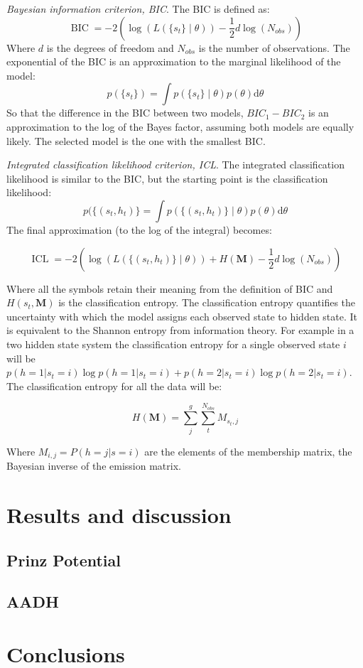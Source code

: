 \emph{Bayesian information criterion, BIC}. The BIC is defined as: 
\begin{equation}
    \operatorname{BIC} = -2\left(\log{\left(L\left(\{s_t\}\middle|\theta\right)\right)} - \frac{1}{2}d\log{\left(N_{obs}\right)}\right)
\end{equation}
Where $d$ is the degrees of freedom and $N_{obs}$ is the number of observations.  
The exponential of the BIC is an approximation to the marginal likelihood of the model:
\begin{equation}
    p(\{s_t\}) = \int p\left(\{s_{t}\}\middle |\theta \right)p(\theta) \mathrm{d}\theta
\end{equation}
So that the difference in the BIC between two models, $BIC_{1}-BIC_{2}$ is an approximation to the log of the Bayes factor, assuming both models are equally likely. The selected model is the one with the smallest BIC. 

\emph{Integrated classification likelihood criterion, ICL}. 
The integrated classification likelihood is similar to the BIC, but the starting point is the classification likelihood: 
\begin{equation}
    p(\{(s_t, h_t)\} = \int p\left(\{(s_{t}, h_{t})\}\middle |\theta \right)p(\theta) \mathrm{d}\theta
\end{equation}
The final approximation (to the log of the integral) becomes: 

\begin{equation}
        \operatorname{ICL} = -2\left(\log{\left(L\left(\{(s_t, h_{t})\}\middle|\theta\right)\right)} + H(\mathbf{M}) - \frac{1}{2}d\log{\left(N_{obs}\right)}\right)
\end{equation}

Where all the symbols retain their meaning from the definition of BIC and $H(s_{t}, \mathbf{M})$ is the classification entropy. The classification entropy quantifies the uncertainty with which the model assigns each observed state to hidden state. It is equivalent to the Shannon entropy from information theory. For example in a two hidden state system the classification entropy for a single observed state $i$ will be $p(h=1|s_t=i)\log{p(h=1|s_t=i)} + p(h=2|s_t=i)\log{p(h=2|s_t=i)}$. The classification entropy for all the data will be: 

\begin{equation}
    H(\mathbf{M}) = \sum_{j}^{g}\sum_{t}^{N_{obs}} M_{s_{t}, j}
\end{equation}

Where $M_{i,j} = P(h=j|s=i)$ are the elements of the membership matrix, the Bayesian inverse of the emission matrix.  

\section{Results and discussion}
\subsection{Prinz Potential}

\subsection{AADH}

\section{Conclusions}


   